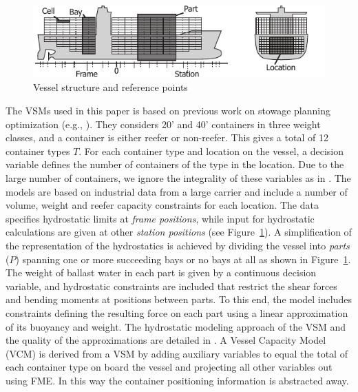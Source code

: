 \documentclass{llncs}
\begin{document}
\begin{figure}[tb]
	\centering
		\includegraphics{figures/vessel6.pdf}
	\caption{Vessel structure and reference points}
	\label{fig:vessel}
\end{figure}

The VSMs used in this paper is based on previous work on stowage planning optimization (e.g., \cite{pacino11,AlbertosThesis}).  
They considers 20' and 40' containers in three weight classes, and a container is either reefer or non-reefer. This gives a total of 12 container types $T$. 
For each container type and location on the vessel, a decision variable defines the number of containers of the type in the location. Due to the large number of containers, we ignore the integrality of these variables as in \cite{pacino11}. 
The models are based on industrial data from a large carrier and include a number of volume, weight and reefer capacity constraints for each location. The data specifies hydrostatic limits at \emph{frame positions}, while input for hydrostatic calculations are given at other \emph{station positions} (see Figure~\ref{fig:vessel}). A simplification of the representation of the hydrostatics is achieved by dividing the vessel into \emph{parts} ($P$) spanning one or more succeeding bays or no bays at all as shown in Figure~\ref{fig:vessel}. 
The weight of ballast water in each part is given by a continuous decision variable, and hydrostatic constraints are included that restrict the shear forces and bending moments at positions between parts. To this end, the model includes constraints defining the resulting force on each part using a linear approximation of its buoyancy and weight. The hydrostatic modeling approach of the VSM and the quality of the approximations are detailed in \cite{ICCL18}. 
%
A Vessel Capacity Model (VCM) is derived from a VSM by adding auxiliary variables to equal the total of each container type on board the vessel and projecting all other variables out using FME. In this way the container positioning information is abstracted away.
\end{document}

